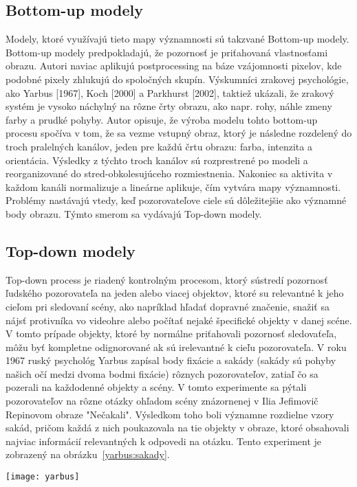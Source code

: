 \documentclass[10pt,twoside,slovak,a4paper]{article}
\begin{document}
\subsection{Bottom-up modely} \label{ina}
Modely, ktoré využívajú tieto mapy významnosti sú takzvané Bottom-up modely. Bottom-up modely predpokladajú, že pozornosť je priťahovaná vlastnosťami obrazu. Autori\cite{bottom} naviac aplikujú postprocessing na báze vzájomnosti pixelov, kde podobné pixely zhlukujú do spoločných skupín. Výskumníci zrakovej psychológie, ako Yarbus [1967], Koch [2000] a Parkhurst [2002], taktiež ukázali, že zrakový systém je vysoko náchylný na rôzne črty obrazu, ako napr. rohy, náhle zmeny farby a prudké pohyby. Autor\cite{saliency:vytvar} opisuje, že výroba modelu tohto bottom-up procesu spočíva v tom, že sa vezme vstupný obraz, ktorý je následne rozdelený do troch pralelných kanálov, jeden pre každú črtu obrazu: farba, intenzita a orientácia. Výsledky z týchto troch kanálov sú rozprestrené po modeli a reorganizované do stred-obkolesujúceho rozmiestnenia. Nakoniec sa aktivita v každom kanáli normalizuje a lineárne aplikuje, čím vytvára mapy významnosti. Problémy nastávajú vtedy, keď pozorovateľove ciele sú dôležitejšie ako významné body obrazu. Týmto smerom sa vydávajú Top-down modely.    

\subsection{Top-down modely} \label{nejaka}
Top-down process je riadený kontrolným procesom, ktorý sústredí pozornosť ľudského pozorovateľa na jeden alebo viacej objektov, ktoré su relevantné k jeho cieľom pri sledovaní scény, ako napríklad hľadať dopravné značenie, snažiť sa nájsť  protivníka vo videohre alebo počítať nejaké špecifické objekty v danej scéne. V tomto prípade objekty, ktoré by normálne priťahovali pozornosť sledovaťeľa, môžu byť kompletne odignorované ak sú irelevantné k cieľu pozorovateľa. V roku 1967 ruský psychológ Yarbus zapísal body fixácie a sakády (sakády sú pohyby našich očí medzi dvoma bodmi fixácie) rôznych pozorovateľov, zatiaľ čo sa pozerali na každodenné objekty a scény. V tomto experimente sa pýtali pozorovateľov na rôzne otázky ohľadom scény znázornenej v Ilia Jefimovič Repinovom  obraze "Nečakali". Výsledkom toho boli významne rozdielne vzory sakád, pričom každá z nich poukazovala na tie objekty v obraze, ktoré obsahovali najviac informácií relevantných k odpovedi na otázku. Tento experiment je zobrazený na obrázku~\ref{yarbus:sakady}.
\begin{figure*}[tbh]
\centering
\texttt{[image: yarbus]}
\caption{ Dopad úloh na pohyb očí. Repinov obraz bol pozorovaný subjektmi s rozlišnými inštrukciami (obrázky idú v poradí zľava doprava zhora dole): 1. Voľné pozorovanie, 2. Odhadnite ich vek, 3. Zistite čo robili pred tým, ako sa ukázal nečakaný hosť, 4. Zapamätajte si oblečenie, ktoré majú na sebe postavy oblečené, 5. Zapamätajte si pozíciu ľudí a objektov v izbe a 6. Predpovedajte, ako dlho bol nečakaný hosť preč od danej rodiny [Yarbus 1967].}
\label{yarbus:sakady}
\end{figure*}
\end{document}
